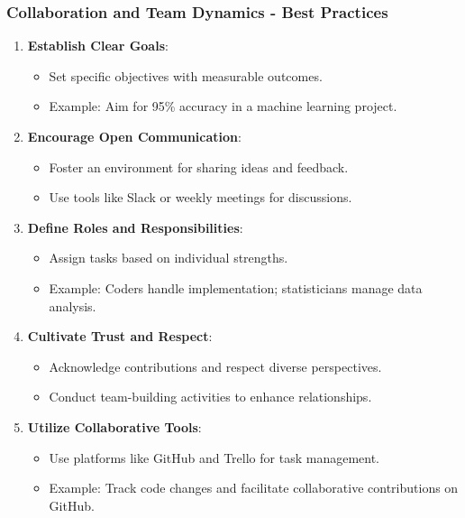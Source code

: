 \documentclass{beamer}
\begin{document}
\begin{frame}[fragile]
    \frametitle{Collaboration and Team Dynamics - Best Practices}
    \begin{enumerate}
        \item \textbf{Establish Clear Goals}:
            \begin{itemize}
                \item Set specific objectives with measurable outcomes. 
                \item Example: Aim for 95\% accuracy in a machine learning project.
            \end{itemize}
        
        \item \textbf{Encourage Open Communication}:
            \begin{itemize}
                \item Foster an environment for sharing ideas and feedback.
                \item Use tools like Slack or weekly meetings for discussions.
            \end{itemize}
        
        \item \textbf{Define Roles and Responsibilities}:
            \begin{itemize}
                \item Assign tasks based on individual strengths.
                \item Example: Coders handle implementation; statisticians manage data analysis.
            \end{itemize}
        
        \item \textbf{Cultivate Trust and Respect}:
            \begin{itemize}
                \item Acknowledge contributions and respect diverse perspectives.
                \item Conduct team-building activities to enhance relationships.
            \end{itemize}
        
        \item \textbf{Utilize Collaborative Tools}:
            \begin{itemize}
                \item Use platforms like GitHub and Trello for task management.
                \item Example: Track code changes and facilitate collaborative contributions on GitHub.
            \end{itemize}
    \end{enumerate}
\end{frame}
\end{document}
